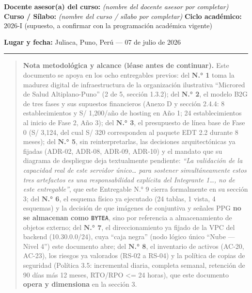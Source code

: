 \documentclass[11pt,a4paper]{article}
\begin{document}
\textbf{Docente asesor(a) del curso:} \textit{(nombre del docente asesor por completar)}
\textbf{Curso / Sílabo:} \textit{(nombre del curso / s\'ilabo por completar)}
\textbf{Ciclo académico:} 2026-I (supuesto, a confirmar con la programación académica vigente)

\textbf{Lugar y fecha:} Juliaca, Puno, Perú --- 07 de julio de 2026

\begin{center}\rule{0.5\linewidth}{0.5pt}\end{center}

\begin{quote}
\textbf{Nota metodológica y alcance (léase antes de continuar).} Este documento se apoya en los ocho entregables previos: del \textbf{N.° 1} toma la madurez digital de infraestructura de la organización ilustrativa ``Microred de Salud Altiplano-Puno'' (2 de 5, sección 1.3.2); del \textbf{N.° 2}, el modelo B2G de tres fases y sus supuestos financieros (Anexo D y sección 2.4.4: 8 establecimientos y S/ 1,200/año de hosting en Año 1; 24 establecimientos al inicio de Fase 2, Año 3); del \textbf{N.° 3}, el presupuesto de línea base de Fase 0 (S/ 3,124, del cual S/ 320 corresponden al paquete EDT 2.2 durante 8 meses); del \textbf{N.° 5}, sin reinterpretarlas, las decisiones arquitectónicas ya fijadas (ADR-02, ADR-08, ADR-09, ADR-10) y el mandato que su diagrama de despliegue deja textualmente pendiente: \emph{``La validación de la capacidad real de este servidor único\ldots{} para sostener simultáneamente estos tres artefactos es una responsabilidad explícita del Integrante 1\ldots, no de este entregable''}, que este Entregable N.° 9 cierra formalmente en su sección 3; del \textbf{N.° 6}, el esquema físico ya ejecutado (24 tablas, 1 vista, 4 esquemas) y la decisión de que imágenes de conjuntiva y señales PPG \textbf{no se almacenan como \texttt{BYTEA}}, sino por referencia a almacenamiento de objetos externo; del \textbf{N.° 7}, el direccionamiento ya fijado de la VPC del backend (10.30.0.0/24), cuya ``caja negra'' (nodo lógico único ``Nube --- Nivel 4'') este documento abre; del \textbf{N.° 8}, el inventario de activos (AC-20, AC-23), los riesgos ya valorados (RS-02 a RS-04) y la política de copias de seguridad (Política 3.5: incremental diaria, completa semanal, retención de 90 días más 12 meses, RTO/RPO \textless= 24 horas), que este documento \textbf{opera y dimensiona} en la sección 3.


\end{quote}
\end{document}
